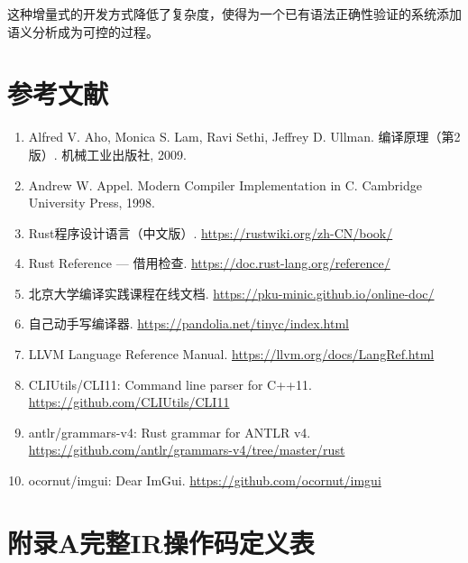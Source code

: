 \documentclass[12pt,a4paper]{ctexart}
\begin{document}
这种增量式的开发方式降低了复杂度，使得为一个已有语法正确性验证的系统添加语义分析成为可控的过程。

\newpage

\section{参考文献}

\begin{enumerate}
    \item Alfred V. Aho, Monica S. Lam, Ravi Sethi, Jeffrey D. Ullman. 编译原理（第2版）. 机械工业出版社, 2009.
    \item Andrew W. Appel. Modern Compiler Implementation in C. Cambridge University Press, 1998.
    \item Rust程序设计语言（中文版）. \url{https://rustwiki.org/zh-CN/book/}
    \item Rust Reference — 借用检查. \url{https://doc.rust-lang.org/reference/}
    \item 北京大学编译实践课程在线文档. \url{https://pku-minic.github.io/online-doc/}
    \item 自己动手写编译器. \url{https://pandolia.net/tinyc/index.html}
    \item LLVM Language Reference Manual. \url{https://llvm.org/docs/LangRef.html}
    \item CLIUtils/CLI11: Command line parser for C++11. \url{https://github.com/CLIUtils/CLI11}
    \item antlr/grammars-v4: Rust grammar for ANTLR v4. \url{https://github.com/antlr/grammars-v4/tree/master/rust}
    \item ocornut/imgui: Dear ImGui. \url{https://github.com/ocornut/imgui}
\end{enumerate}

\newpage

\section*{附录A\quad 完整IR操作码定义表}
\end{document}
